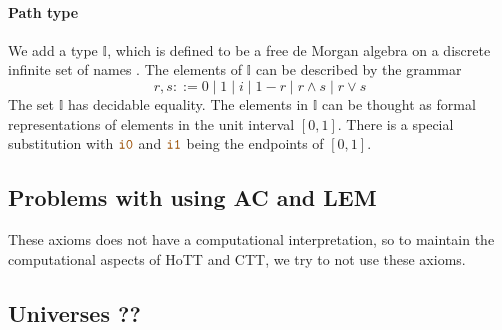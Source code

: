 \documentclass[twoside,11pt,openright]{report}
\theoremstyle{plain} %
\theoremstyle{definition}
\theoremstyle{remark}
\newcommand*{\constant}[1]{\textcolor{orange!60!black}{\ensuremath{\mathtt{#1}}}}
\begin{document}
\paragraph{Path type}
We add a type \(\mathbb{I}\), which is defined to be a free de Morgan algebra on a discrete infinite set of names . The elements of \(\mathbb{I}\) can be described by the grammar
\begin{equation}
  r,s ::= 0 \mid 1 \mid i \mid 1 - r \mid r \land s \mid r \lor s
\end{equation}
The set \(\mathbb{I}\) has decidable equality. The elements in \(\mathbb{I}\) can be thought as formal representations of elements in the unit interval \([0,1]\). There is a special substitution with \(\constant{i0}\) and \(\constant{i1}\) being the endpoints of \([0,1]\).

\subsection{Problems with using AC and LEM}
These axioms does not have a computational interpretation, so to maintain the computational aspects of HoTT and CTT, we try to not use these axioms. \cite[Introduction]{hottbook}

\subsection{Universes ??}
\end{document}
